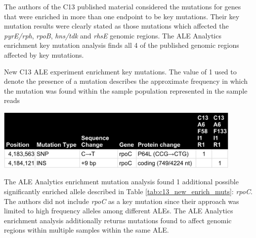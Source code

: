 \documentclass[12pt,final,masters,chapterheads]{ucsd}  %
\begin{document}
The authors of the C13 published material considered the mutations for genes that were enriched in more than one endpoint to be key mutations. Their key mutation results were clearly stated as those mutations which affected the \textit{pyrE/rph}, \textit{rpoB}, \textit{hns/tdk} and \textit{rhsE} genomic regions. The ALE Analytics enrichment key mutation analysis finds all 4 of the published genomic regions affected by key mutations.
\begin{table}[H]
  \caption{New C13 ALE experiment enrichment key mutations. The value of 1 used to denote the presence of a mutation describes the approximate frequency in which the mutation was found within the sample population represented in the sample reads \cite{breseq_paper}}
  \centering
  \includegraphics[width=0.9\textwidth]{c13_new_enrich_muts.png}
  \label{tab:c13_new_enrich_muts}
\end{table}
The ALE Analytics enrichment mutation analysis found 1 additional possible significantly enriched allele described in Table \ref{tab:c13_new_enrich_muts}: \textit{rpoC}. The authors did not include \textit{rpoC} as a key mutation since their approach was limited to high frequency alleles among different ALEs. The ALE Analytics enrichment analysis additionally returns mutations found to affect genomic regions within multiple samples within the same ALE.
\end{document}
